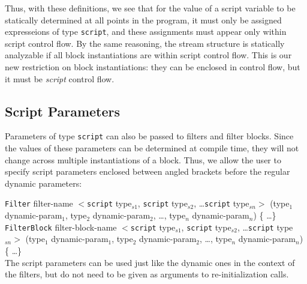 \documentclass[draft]{article}
\begin{document}
Thus, with these definitions, we see that for the value of a script
variable to be statically determined at all points in the program, it
must only be assigned expresseions of type {\tt script}, and these
assignments must appear only within script control flow.  By the same
reasoning, the stream structure is statically analyzable if all block
instantiations are within script control flow.  This is our new
restriction on block instantiations: they can be enclosed in control
flow, but it must be {\it script} control flow.

\subsection{Script Parameters}

Parameters of type {\tt script} can also be passed to filters and
filter blocks.  Since the values of these parameters can be determined
at compile time, they will not change across multiple instantiations
of a block.  Thus, we allow the user to specify script parameters
enclosed between angled brackets before the regular dynamic
parameters:

{\tt Filter} filter-name $<${\tt script} type$_{s1}$, {\tt script} type$_{s2}$, \dots {\tt script} type$_{sn}>$ (type$_1$ dynamic-param$_1$, type$_2$ dynamic-param$_2$, \dots , type$_n$ dynamic-param$_n$) \{ \dots \} \\

{\tt FilterBlock} filter-block-name $<${\tt script} type$_{s1}$, {\tt script} type$_{s2}$, \dots {\tt script} type$_{sn}>$ (type$_1$ dynamic-param$_1$, type$_2$ dynamic-param$_2$, \dots , type$_n$ dynamic-param$_n$) \{ \dots \} \\

The script parameters can be used just like the dynamic ones in the
context of the filters, but do not need to be given as arguments to
re-initialization calls.
\end{document}
